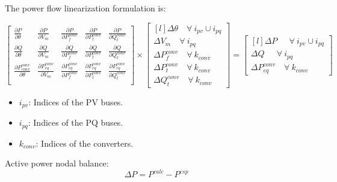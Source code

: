 \documentclass[11pt]{article}
\begin{document}
	The power flow linearization formulation is:
	
	\begin{equation}
		\label{eq:acdc_syst}
		\begin{bmatrix}
			\frac{\partial P}{\partial \theta} & \frac{\partial P}{\partial V_m} & \frac{\partial P}{\partial P_f^{conv}} & \frac{\partial P}{\partial P_t^{conv}} & \frac{\partial P}{\partial Q_t^{conv}}\\
			\frac{\partial Q}{\partial \theta} & \frac{\partial Q}{\partial V_m} & \frac{\partial Q}{\partial P_f^{conv}} & \frac{\partial Q}{\partial P_t^{conv}} & \frac{\partial Q}{\partial Q_t^{conv}}\\
			\frac{\partial P_{conv}^{conv}}{\partial \theta} & \frac{\partial P_{eq}^{conv}}{\partial V_m} & \frac{\partial P_{eq}^{conv}}{\partial P_f^{conv}} & \frac{\partial P_{eq}^{conv}}{\partial P_t^{conv}} & \frac{\partial P_{eq}^{conv}}{\partial Q_t^{conv}}\\
		\end{bmatrix}	
		\times 
		\begin{bmatrix*}[l]
			\Delta \theta  \quad \forall \ i_{pv} \cup i_{pq}   \\
			\Delta V_m     \quad \forall \ i_{pq}  \\
			\Delta P_f^{conv}     \quad \forall \ k_{conv} \\
			\Delta P_t^{conv}     \quad \forall \ k_{conv} \\
			\Delta Q_t^{conv}     \quad \forall \ k_{conv}
		\end{bmatrix*}
		= 
		\begin{bmatrix*}[l]
			\Delta P \quad \ \ \forall \ i_{pv} \cup i_{pq} \\
			\Delta Q \quad \ \ \forall \ i_{pq}  \\
			\Delta P_{eq}^{conv} \quad \forall \ k_{conv} 
		\end{bmatrix*}
	\end{equation}

\begin{itemize}
	
	\item $i_{pv}$: Indices of the PV buses.
	\item $i_{pq}$: Indices of the PQ buses.
	\item $k_{conv}$: Indices of the converters.
\end{itemize}
	
	
	Active power nodal balance:
	\begin{equation}
		\Delta P = P^{calc} - P^{esp}
	\end{equation}
	
\end{document}
